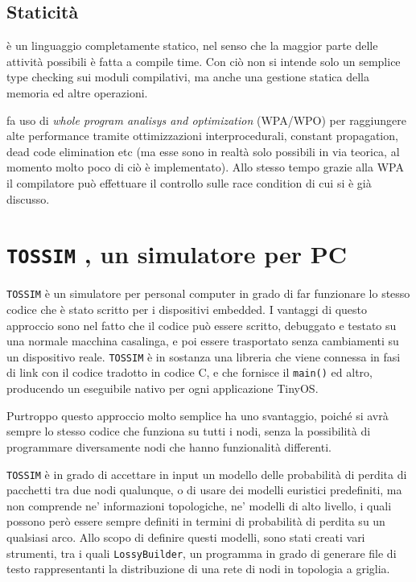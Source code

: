 \documentclass[twoside,11pt,a4paper,italian,openany]{book}
\newcommand{\tos}{\texttt{TOSSIM} }
\begin{document}
\subsection{Staticità}

\nesc è un linguaggio completamente statico, nel senso che la maggior parte delle attività 
possibili è fatta a compile time. Con ciò non si intende solo un semplice type checking sui 
moduli compilativi, ma anche una gestione statica della memoria ed altre operazioni. 


\nesc fa uso di \emph{whole program analisys and optimization} (WPA/WPO) per raggiungere alte
performance tramite ottimizzazioni interprocedurali, constant propagation, dead code 
elimination etc (ma esse sono in realtà solo possibili in via teorica, 
al momento molto poco di ciò è implementato).
Allo stesso tempo grazie alla WPA il compilatore può effettuare il controllo sulle race condition
di cui si è già discusso. 



\section{\tos, un simulatore per PC}
\tos\cite{TOSSIM} è un simulatore per personal computer  in grado di far funzionare lo 
stesso codice \nesc che è stato scritto per i dispositivi embedded. 
I vantaggi di questo approccio sono nel fatto che il codice può essere scritto, 
debuggato e testato su una normale macchina casalinga, e poi essere trasportato 
senza cambiamenti su un dispositivo reale. 
\tos è in sostanza una libreria che viene connessa in fasi di link con il codice \nesc 
tradotto in codice C, e che fornisce il \texttt{main()} ed altro, producendo un 
eseguibile nativo per ogni applicazione TinyOS.

Purtroppo questo approccio molto semplice ha uno svantaggio, poiché si avrà sempre 
lo stesso codice che funziona su tutti i nodi, senza la possibilità di programmare diversamente nodi che hanno funzionalità differenti. 

\tos è in grado di accettare in input un modello delle probabilità di perdita di pacchetti 
tra due nodi qualunque, o di usare dei modelli euristici predefiniti, ma non comprende ne' 
informazioni topologiche, ne' modelli di alto livello, i quali possono però essere sempre 
definiti in termini di probabilità di perdita su un qualsiasi arco.
Allo scopo di definire questi modelli, sono stati creati vari strumenti, tra i quali 
\texttt{LossyBuilder}, un programma in grado di generare file di testo rappresentanti 
la distribuzione di una rete di nodi in topologia a griglia.
\end{document}
